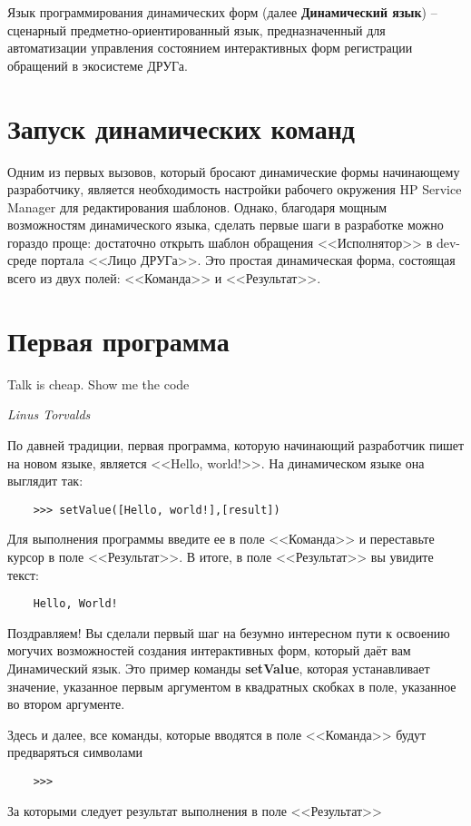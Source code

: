 \documentclass[../index.tex]{subfiles}
\begin{document}
        Язык программирования динамических форм (далее \textbf{Динамический язык}) -- сценарный предметно-ориентированный язык, предназначенный для автоматизации управления состоянием 
        интерактивных форм регистрации обращений в экосистеме ДРУГа.
        
    \section{Запуск динамических команд}
    Одним из первых вызовов, который бросают динамические формы начинающему разработчику, является необходимость настройки рабочего окружения HP Service Manager для редактирования шаблонов. Однако, благодаря мощным возможностям динамического языка, сделать первые шаги в разработке можно гораздо проще: достаточно открыть шаблон обращения <<Исполнятор>> в dev-среде портала <<Лицо ДРУГа>>. Это простая динамическая форма, состоящая всего из двух полей: <<Команда>> и <<Результат>>.
    
    \section{Первая программа}
        
    \epigraph{Talk is cheap. Show me the code}{\textit{Linus Torvalds}}
    
    По давней традиции, первая программа, которую начинающий разработчик пишет на новом языке, является <<Hello, world!>>. На динамическом языке она выглядит так:
    \begin{verbatim}
    >>> setValue([Hello, world!],[result])
    \end{verbatim}
    
    Для выполнения программы введите ее в поле <<Команда>> и переставьте курсор в поле <<Результат>>. В итоге, в поле <<Результат>> вы увидите текст:
    
    \begin{verbatim}
    Hello, World!
    \end{verbatim}
    
    Поздравляем! Вы сделали первый шаг на безумно интересном пути к освоению могучих возможностей создания интерактивных форм, который даёт вам Динамический язык.
    Это пример команды {\bf setValue}, которая устанавливает значение, указанное первым аргументом в квадратных скобках в поле, указанное во втором аргументе.
    
    Здесь и далее, все команды, которые вводятся в поле <<Команда>> будут предваряться символами     \begin{verbatim}
    >>>
    \end{verbatim}    За которыми следует результат выполнения в поле <<Результат>>
    
\end{document}
